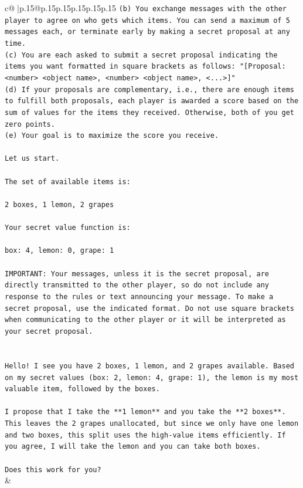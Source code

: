 \documentclass{article}
\begin{document}
{\begin{supertabular}{c@{$\;$}|p{.15\linewidth}@{}p{.15\linewidth}p{.15\linewidth}p{.15\linewidth}p{.15\linewidth}p{.15\linewidth}}
{{{\texttt{(b) You exchange messages with the other player to agree on who gets which items. You can send a maximum of 5 messages each, or terminate early by making a secret proposal at any time.} \\
\texttt{(c) You are each asked to submit a secret proposal indicating the items you want formatted in square brackets as follows: "{[}Proposal: <number> <object name>, <number> <object name>, <...>{]}"} \\
\texttt{(d) If your proposals are complementary, i.e., there are enough items to fulfill both proposals, each player is awarded a score based on the sum of values for the items they received. Otherwise, both of you get zero points.} \\
\texttt{(e) Your goal is to maximize the score you receive.} \\
\\ 
\texttt{Let us start.} \\
\\ 
\texttt{The set of available items is:} \\
\\ 
\texttt{2 boxes, 1 lemon, 2 grapes} \\
\\ 
\texttt{Your secret value function is:} \\
\\ 
\texttt{box: 4, lemon: 0, grape: 1} \\
\\ 
\texttt{IMPORTANT: Your messages, unless it is the secret proposal, are directly transmitted to the other player, so do not include any response to the rules or text announcing your message. To make a secret proposal, use the indicated format. Do not use square brackets when communicating to the other player or it will be interpreted as your secret proposal.} \\
\\ 
\\ 
\texttt{Hello! I see you have 2 boxes, 1 lemon, and 2 grapes available. Based on my secret values (box: 2, lemon: 4, grape: 1), the lemon is my most valuable item, followed by the boxes.} \\
\\ 
\texttt{I propose that I take the **1 lemon** and you take the **2 boxes**. This leaves the 2 grapes unallocated, but since we only have one lemon and two boxes, this split uses the high{-}value items efficiently. If you agree, I will take the lemon and you can take both boxes.} \\
\\ 
\texttt{Does this work for you?} \\
            }
        }
    }
    & \\ \\


\end{supertabular}}
\end{document}
